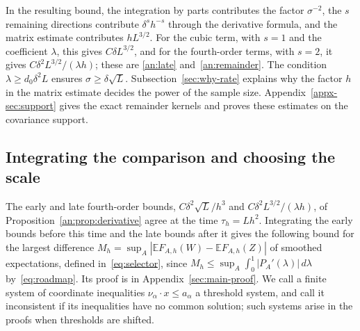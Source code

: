 \documentclass[11pt,letterpaper]{article}
\newif\ifshowpolish
\newcommand{\polish}[1]{\ifshowpolish{\color{magenta}%
\hypersetup{linkcolor=magenta,citecolor=magenta,urlcolor=magenta}#1}\else#1\fi}
\newif\ifshowrev
\newcommand{\rev}[1]{\ifshowrev{\color{revblue}%
\hypersetup{linkcolor=revblue,citecolor=revblue,urlcolor=revblue}#1}\else#1\fi}
\newif\ifshowrevnotes
\newcommand{\revnote}[1]{\ifshowrevnotes{\color{revblue}\footnotesize[#1]}\fi}
\newenvironment{revblock}{\ifshowrev\color{revblue}%
\hypersetup{linkcolor=revblue,citecolor=revblue,urlcolor=revblue}\fi}{}
\newif\ifshowtrim
\newcommand{\trim}[1]{\ifshowtrim{\color{revblue}%
\hypersetup{linkcolor=revblue,citecolor=revblue,urlcolor=revblue}#1}\else#1\fi}
\newcommand{\trs}[1]{\ifshowtrim{\color{revblue}#1}\else#1\fi}
\newif\ifshowlin
\newcommand{\lin}[1]{\ifshowlin{\color{revblue}%
\hypersetup{linkcolor=revblue,citecolor=revblue,urlcolor=revblue}#1}\else#1\fi}
\theoremstyle{remark}
\newcommand{\E}{\mathbb E}
\newcommand{\dd}{\,d}
\begin{document}
\begin{revblock}
In the resulting bound, the integration by parts contributes the factor
\(\sigma^{-2}\), the \(s\) remaining directions contribute
\(\delta^sh^{-s}\) through the derivative formula, and the matrix estimate
contributes \(hL^{3/2}\). For the cubic term, with \(s=1\) and the
coefficient \(\lambda\), this gives \(C\delta L^{3/2}\), and for the
fourth-order terms, with \(s=2\), it gives \(C\delta^2L^{3/2}/(\lambda h)\);
these are \eqref{an:late} and~\eqref{an:remainder}. The condition
\(\lambda\ge d_0\delta^2L\) ensures \(\sigma\ge\delta\sqrt L\).
\trim{Subsection~\ref{sec:why-rate} explains why the factor \(h\) in the
matrix estimate decides the power of the sample size.}
\end{revblock}
\polish{Appendix~\ref{appx-sec:support} gives the exact remainder kernels and proves
these estimates on the covariance support.} \revnote{Proposition~1 is
now the only statement of these bounds; the appendix proves it without
restating it.}


\subsection{\texorpdfstring{\trs{Integrating the comparison and choosing the scale}}{Integrating the comparison and choosing the scale}}\label{sec:rate}
\rev{The early and late fourth-order bounds\trim{,
\(C\delta^2\sqrt L/h^3\) and \(C\delta^2L^{3/2}/(\lambda h)\),} of
Proposition~\ref{an:prop:derivative} agree at the time
\(\tau_h=Lh^2\). Integrating the early bounds before this time and the
late bounds after it gives the following \trim{bound for the largest
difference \(M_h=\sup_A|\E F_{A,h}(W)-\E F_{A,h}(Z)|\) of smoothed
expectations, defined in~\eqref{eq:selector}, since
\(M_h\le\sup_A\int_0^1|P_A'(\lambda)|\dd\lambda\)
by~\eqref{eq:roadmap}}. Its proof is in Appendix~\ref{sec:main-proof}.}
\lin{We call a finite system of coordinate inequalities
\(\nu_\alpha\cdot x\le a_\alpha\) a threshold system, and call it
inconsistent if its inequalities have no common solution; such systems
arise in the proofs when thresholds are shifted.}
\end{document}
